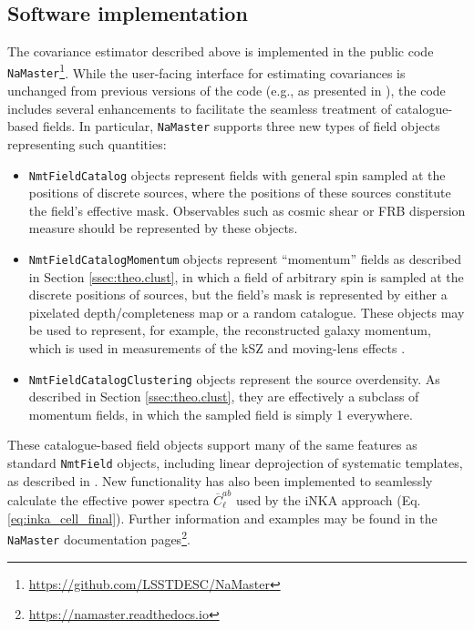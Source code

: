 \documentclass[%
 reprint,
superscriptaddress,
nofootinbib,
 amsmath,amssymb,
 aps,
 prd,
]{revtex4-2}
\newcommand{\nmt}{{\tt NaMaster}\xspace}
\begin{document}
  \subsection{Software implementation}\label{ssec:theo.nmt}
    The covariance estimator described above is implemented in the public code \nmt\footnote{\url{https://github.com/LSSTDESC/NaMaster}}. While the user-facing interface for estimating covariances is unchanged from previous versions of the code (e.g., as presented in \cite{1906.11765}), the code includes several enhancements to facilitate the seamless treatment of catalogue-based fields. In particular, \nmt supports three new types of field objects representing such quantities:
    \begin{itemize}
      \item \texttt{NmtFieldCatalog} objects represent fields with general spin sampled at the positions of discrete sources, where the positions of these sources constitute the field's effective mask. Observables such as cosmic shear or FRB dispersion measure should be represented by these objects.
      \item \texttt{NmtFieldCatalogMomentum} objects represent ``momentum'' fields as described in Section \ref{ssec:theo.clust}, in which a field of arbitrary spin is sampled at the discrete positions of sources, but the field's mask is represented by either a pixelated depth/completeness map or a random catalogue. These objects may be used to represent, for example, the reconstructed galaxy momentum, which is used in measurements of the kSZ and moving-lens effects \cite{2512.14625,2605.15947,2605.18938}.
      \item \texttt{NmtFieldCatalogClustering} objects represent the source overdensity. As described in Section \ref{ssec:theo.clust}, they are effectively a subclass of momentum fields, in which the sampled field is simply 1 everywhere.
    \end{itemize}
    These catalogue-based field objects support many of the same features as standard \texttt{NmtField} objects, including linear deprojection of systematic templates, as described in \cite{2510.19912}. New functionality has also been implemented to seamlessly calculate the effective power spectra $\overline{C}^{ab}_\ell$ used by the iNKA approach (Eq. \ref{eq:inka_cell_final}). Further information and examples may be found in the \nmt documentation pages\footnote{\url{https://namaster.readthedocs.io}}.
\end{document}
